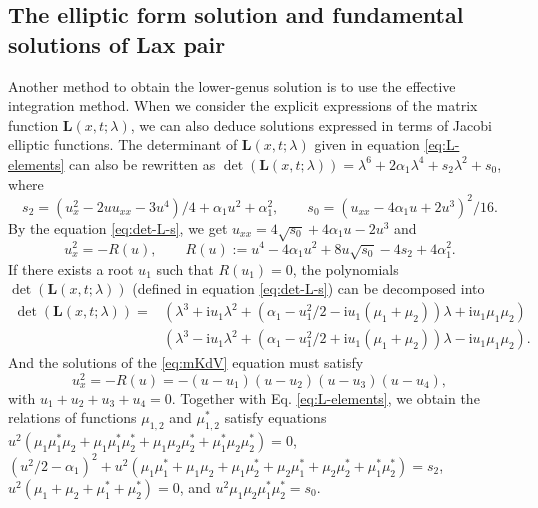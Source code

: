 \documentclass[11pt,reqno]{amsart}
\newcommand{\ii}{\mathrm{i}}
\numberwithin{equation}{section}
\begin{document}
\subsection{The elliptic form solution and fundamental solutions of Lax pair}\label{sec:effective-integration-method}
Another method to obtain the lower-genus solution is to use the effective integration method.
When we consider the explicit expressions of the matrix function $\mathbf{L}(x,t;\lambda)$, we can also deduce solutions expressed in terms of Jacobi elliptic functions.
The determinant of $\mathbf{L}(x,t;\lambda)$ given in equation \eqref{eq:L-elements} can also be rewritten as $\det\left(\mathbf{L}(x,t;\lambda)\right)
=\lambda^6+2\alpha_1\lambda^4
+s_2\lambda^2+s_0$, where
\begin{equation}\label{eq:det-L-s}
	s_2 = (u_x^2-2uu_{xx}-3u^4)/4+\alpha_1u^2+\alpha_1^2, \qquad 
	s_0 = (u_{xx}-4\alpha_1u+2u^3)^2/16.
\end{equation}
By the equation \eqref{eq:det-L-s}, we get $u_{xx}=4\sqrt{s_0}+4\alpha_1 u -2u^3$ and
\begin{equation}\label{eq:define-R-u}
	u_x^2=-R(u), \qquad R(u):=u^4-4\alpha_1 u^2+8u\sqrt{s_0}-4s_2+4\alpha_1^2.
\end{equation}
If there exists a root $u_1$ such that $R(u_1)=0$, the polynomials $\det(\mathbf{L}(x,t;\lambda))$ (defined in equation \eqref{eq:det-L-s}) can be decomposed into 
\begin{equation}\label{eq:det-L-poly}
	\begin{split}
		\det(\mathbf{L}(x,t;\lambda))=
		& \left(\lambda^3+\ii u_1\lambda^2+(\alpha_1-u_1^2/2-\ii 	u_1(\mu_1+\mu_2))\lambda+\ii u_1 \mu_1\mu_2\right)\\
		& \left(\lambda^3-\ii u_1\lambda^2+(\alpha_1-u_1^2/2+\ii 	u_1(\mu_1+\mu_2))\lambda-\ii u_1 \mu_1\mu_2\right).
	\end{split}
\end{equation}
And the solutions of the \ref{eq:mKdV} equation must satisfy
\begin{equation}\label{eq:solution-u-ux}
	u_x^2=-R(u)=-(u-u_1)(u-u_2)(u-u_3)(u-u_4), 
\end{equation} 
with $u_1+u_2+u_3+u_4=0$.
Together with Eq. \eqref{eq:L-elements}, 
we obtain the relations of functions $\mu_{1,2}$ and $\mu_{1,2}^*$ satisfy equations $u^2(\mu_1\mu_1^*\mu_2+\mu_1\mu_1^*\mu_2^*+\mu_1\mu_2\mu_2^*+\mu_1^*\mu_2\mu_2^*)=0$, $(u^2/2-\alpha_1)^2+u^2(\mu_1\mu_1^*+\mu_1\mu_2+\mu_1\mu_2^*+\mu_2\mu_1^*+\mu_2\mu_2^*+\mu_1^*\mu_2^*)=s_2$,  
$u^2(\mu_1+\mu_2+\mu_1^*+\mu_2^*)=0$, and $u^2\mu_1\mu_2\mu_1^*\mu_2^*=s_0$.
\end{document}

